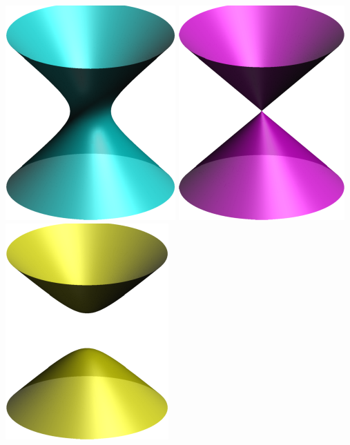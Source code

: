 \begin{examples}{}{}
\begin{enumerate}
\begin{center}
			\includegraphics{surfaces-hyper1} \qquad \includegraphics{surfaces-cone} \qquad \includegraphics{surfaces-hyper2}
		\end{center}
	\end{enumerate}
\end{examples}

